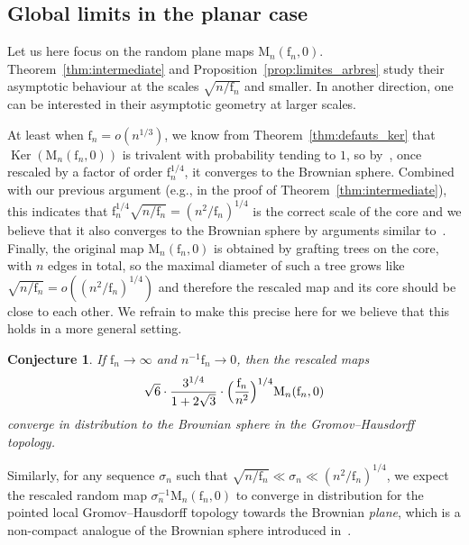\documentclass[11pt]{article}
\newcommand{\eg}{e.g.,\xspace}
\theoremstyle{plain}
\newtheorem{conjecture}[theorem]{Conjecture}
\theoremstyle{definition}
\theoremstyle{remark}
\newcommand{\Map}{\mathrm{M}}
\newcommand{\face}{\mathrm{f}}
\DeclareMathOperator{\Ker}{Ker}
\begin{document}
\subsection{Global limits in the planar case}
\label{ssec:TBM}

Let us here focus on the random plane maps $\Map_n(\face_n, 0)$. Theorem~\ref{thm:intermediate} and Proposition~\ref{prop:limites_arbres} study their asymptotic behaviour at the scales $\sqrt{n/\face_n}$ and smaller.
In another direction, one can be interested in their asymptotic geometry at larger scales.

At least when $\face_n = o(n^{1/3})$, we know from Theorem~\ref{thm:defauts_ker} that $\Ker(\Map_n(\face_n, 0))$ is trivalent with probability tending to $1$, so by~\cite[Cor.\,23]{CLG19}, once rescaled by a factor of order $\face_n^{1/4}$, it converges to the Brownian sphere. Combined with our previous argument (\eg in the proof of Theorem~\ref{thm:intermediate}), this indicates that $\face_n^{1/4} \sqrt{n/ \face_n} = (n^2/\face_n)^{1/4}$ is the correct scale of the core and we believe that it also converges to the Brownian sphere by arguments similar to~\cite{CLG19}. Finally, the original map $\Map_n(\face_n, 0)$ is obtained by grafting trees on the core, with $n$ edges in total, so the maximal diameter of such a tree grows like
$
\sqrt{n/\face_n} = o((n^2/\face_n)^{1/4})$ and therefore the rescaled map and its core should be close to each other.
We refrain to make this precise here for we believe that this holds in a more general setting.

\begin{conjecture}\label{conjecture}
If $\face_n \to \infty$ and $n^{-1} \face_n \to 0$, then the rescaled maps
\[
\sqrt{6} \cdot \frac{3^{1/4}}{1+2\sqrt{3}} \cdot \Bigl(\frac{\face_n}{n^2}\Bigr)^{1/4} \Map_n(\face_n, 0)
\]
converge in distribution to the Brownian sphere in the Gromov--Hausdorff topology.
\end{conjecture}

Similarly, for any sequence $\sigma_n$ such that $\sqrt{n/\face_n} \ll \sigma_n \ll (n^2/\face_n)^{1/4}$, we expect the rescaled random map $\sigma_n^{-1} \Map_n(\face_{n},0)$ to converge in distribution for the pointed local Gromov--Hausdorff topology towards the Brownian \emph{plane}, which is a non-compact analogue of the Brownian sphere introduced in~\cite{CLG14}.
\end{document}
